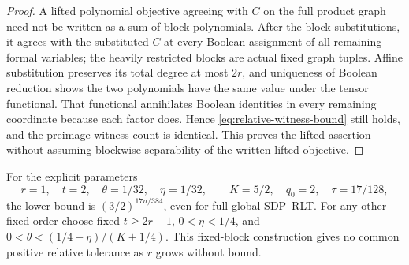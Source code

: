 \begin{proof}
A lifted polynomial objective agreeing with $C$ on the full product
graph need not be written as a sum of block polynomials.
After the block substitutions, it agrees with the substituted $C$ at
every Boolean assignment of all remaining formal variables; the heavily
restricted blocks are actual fixed graph tuples. Affine substitution
preserves its total degree at most $2r$, and uniqueness of Boolean
reduction shows the two polynomials have the same value under the tensor
functional. That functional annihilates Boolean identities in every
remaining coordinate because each factor does. Hence
\eqref{eq:relative-witness-bound} still holds, and the preimage witness
count is identical. This proves the lifted assertion without assuming
blockwise separability of the written lifted objective.
\end{proof}

For the explicit parameters
\begin{equation}\label{eq:relative-example}
 r=1,\quad t=2,\quad\theta=1/32,\quad\eta=1/32,
 \qquad K=5/2,\quad q_0=2,\quad\tau=17/128,
\end{equation}
the lower bound is $(3/2)^{17n/384}$, even for full global SDP--RLT.
For any other fixed order choose fixed $t\ge2r-1$, $0<\eta<1/4$,
and $0<\theta<(1/4-\eta)/(K+1/4)$.
This fixed-block construction gives no common positive relative
tolerance as $r$ grows without bound.

